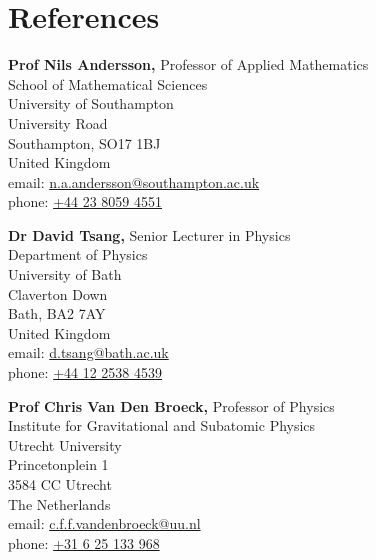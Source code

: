 \section{References}

\parbox[t]{\linewidth}{\raggedright%
    \textbf{Prof Nils Andersson,} Professor of Applied Mathematics \\
    School of Mathematical Sciences \\
    University of Southampton \\
    University Road \\
    Southampton, SO17 1BJ \\
    United Kingdom \\
    email: \href{mailto:n.a.andersson@southampton.ac.uk}{n.a.andersson@southampton.ac.uk} \\
    phone: \href{tel:+44 23 8059 4551}{+44 23 8059 4551}
}

\parbox[t]{\linewidth}{\raggedright%
    \textbf{Dr David Tsang,} Senior Lecturer in Physics \\
    Department of Physics \\
    University of Bath \\
    Claverton Down \\
    Bath, BA2 7AY \\
    United Kingdom \\
    email: \href{mailto:d.tsang@bath.ac.uk}{d.tsang@bath.ac.uk} \\
    phone: \href{tel:+44 12 2538 4539}{+44 12 2538 4539}
}

\parbox[t]{\linewidth}{\raggedright%
    \textbf{Prof Chris Van Den Broeck,} Professor of Physics \\
    Institute for Gravitational and Subatomic Physics \\
    Utrecht University \\
    Princetonplein 1 \\
    3584 CC Utrecht \\
    The Netherlands \\
    email: \href{mailto:c.f.f.vandenbroeck@uu.nl}{c.f.f.vandenbroeck@uu.nl} \\
    phone: \href{tel:+31 6 25 13 3968}{+31 6 25 133 968}
}
